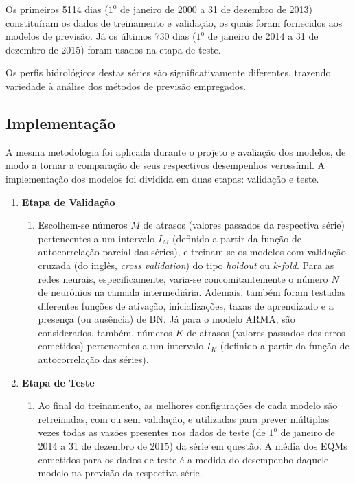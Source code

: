 \documentclass[a4paper]{article}
\begin{document}
\begin{multicols}{2}
    Os primeiros 5114 dias ($1^\text{o}$ de janeiro de 2000 a 31 de dezembro de 2013) constituíram os dados de treinamento e validação, os quais foram fornecidos aos modelos de previsão. Já os últimos 730 dias ($1^\text{o}$ de janeiro de 2014 a 31 de dezembro de 2015) foram usados na etapa de teste.
    
    Os perfis hidrológicos destas séries são significativamente diferentes, trazendo variedade à análise dos métodos de previsão empregados.

\subsection{Implementação}
\label{subsec:implementacao}

    A mesma metodologia foi aplicada durante o projeto e avaliação dos modelos, de modo a tornar a comparação de seus respectivos desempenhos verossímil. A implementação dos modelos foi dividida em duas etapas: validação e teste.
    
\begin{enumerate}[noitemsep]
  \item \textbf{Etapa de Validação}
  \begin{enumerate}[label*=\arabic*.]
    \item Escolhem-se números $M$ de atrasos (valores passados da respectiva série) pertencentes a um intervalo $I_M$ (definido a partir da função de autocorrelação parcial das séries), e treinam-se os modelos com validação cruzada (do inglês, \textit{cross validation}) do tipo \textit{holdout} ou $k$-\textit{fold}. Para as redes neurais, especificamente, varia-se concomitantemente o número $N$ de neurônios na camada intermediária. Ademais, também foram testadas diferentes funções de ativação, inicializações, taxas de aprendizado e a presença (ou ausência) de BN. Já para o modelo ARMA, são considerados, também, números $K$ de atrasos (valores passados dos erros cometidos) pertencentes a um intervalo $I_K$ (definido a partir da função de autocorrelação das séries).
  \end{enumerate}
  \item \textbf{Etapa de Teste}
  \begin{enumerate}[label*=\arabic*.]
    \item Ao final do treinamento, as melhores configurações de cada modelo são retreinadas, com ou sem validação, e utilizadas para prever múltiplas vezes todas as vazões presentes nos dados de teste (de $1^\text{o}$ de janeiro de 2014 a 31 de dezembro de 2015) da série em questão. A média dos EQMs cometidos para os dados de teste é a medida do desempenho daquele modelo na previsão da respectiva série.
  \end{enumerate}
\end{enumerate}
    

\end{multicols}
\end{document}
